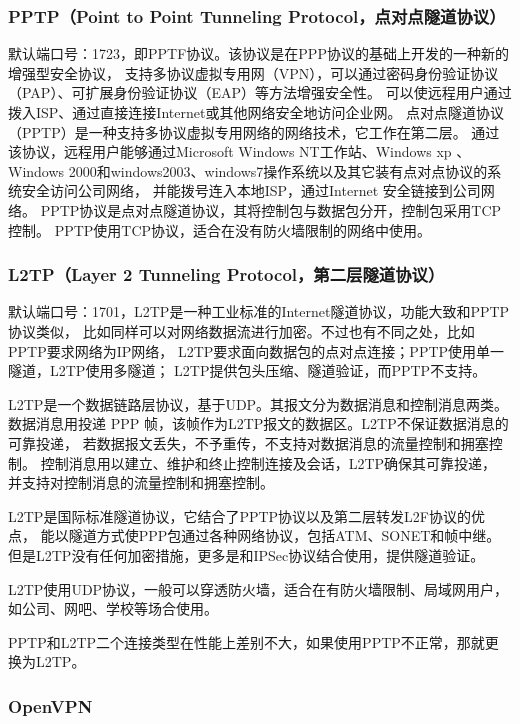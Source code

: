 \documentclass{book}
\begin{document}
\subsubsection{PPTP（Point to Point Tunneling Protocol，点对点隧道协议）}

默认端口号：1723，即PPTF协议。该协议是在PPP协议的基础上开发的一种新的增强型安全协议，
支持多协议虚拟专用网（VPN），可以通过密码身份验证协议（PAP）、可扩展身份验证协议（EAP）等方法增强安全性。
可以使远程用户通过拨入ISP、通过直接连接Internet或其他网络安全地访问企业网。
点对点隧道协议（PPTP）是一种支持多协议虚拟专用网络的网络技术，它工作在第二层。
通过该协议，远程用户能够通过Microsoft Windows NT工作站、Windows xp 、
Windows 2000和windows2003、windows7操作系统以及其它装有点对点协议的系统安全访问公司网络，
并能拨号连入本地ISP，通过Internet 安全链接到公司网络。
PPTP协议是点对点隧道协议，其将控制包与数据包分开，控制包采用TCP控制。
PPTP使用TCP协议，适合在没有防火墙限制的网络中使用。

\subsubsection{L2TP（Layer 2 Tunneling Protocol，第二层隧道协议）}

默认端口号：1701，L2TP是一种工业标准的Internet隧道协议，功能大致和PPTP协议类似，
比如同样可以对网络数据流进行加密。不过也有不同之处，比如PPTP要求网络为IP网络，
L2TP要求面向数据包的点对点连接；PPTP使用单一隧道，L2TP使用多隧道；
L2TP提供包头压缩、隧道验证，而PPTP不支持。

L2TP是一个数据链路层协议，基于UDP。其报文分为数据消息和控制消息两类。
数据消息用投递 PPP 帧，该帧作为L2TP报文的数据区。L2TP不保证数据消息的可靠投递，
若数据报文丢失，不予重传，不支持对数据消息的流量控制和拥塞控制。
控制消息用以建立、维护和终止控制连接及会话，L2TP确保其可靠投递，
并支持对控制消息的流量控制和拥塞控制。

L2TP是国际标准隧道协议，它结合了PPTP协议以及第二层转发L2F协议的优点，
能以隧道方式使PPP包通过各种网络协议，包括ATM、SONET和帧中继。
但是L2TP没有任何加密措施，更多是和IPSec协议结合使用，提供隧道验证。

L2TP使用UDP协议，一般可以穿透防火墙，适合在有防火墙限制、局域网用户，如公司、网吧、学校等场合使用。

PPTP和L2TP二个连接类型在性能上差别不大，如果使用PPTP不正常，那就更换为L2TP。

\subsubsection{OpenVPN}
\end{document}

